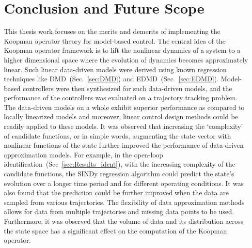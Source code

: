 \section{Conclusion and Future Scope}
\label{Chapter:Conc}
This thesis work focuses on the merits and demerits of implementing the Koopman operator theory for model-based control. The central idea of the Koopman operator framework is to lift the nonlinear dynamics of a system to a higher dimensional space where the evolution of dynamics becomes approximately linear. Such linear data-driven models were derived using known regression techniques like DMD~(Sec.~\ref{sec:DMD}) and EDMD~(Sec.~\ref{sec:EDMD}). Model-based controllers were then synthesized for such data-driven models, and the performance of the controllers was evaluated on a trajectory tracking problem. The data-driven models on a whole exhibit superior performance as compared to locally linearized models and moreover, linear control design methods could be readily applied to these models. It was observed that increasing the `complexity' of candidate functions, or in simple words, augmenting the state vector with nonlinear functions of the state further improved the performance of data-driven approximation models. For example, in the open-loop identification~(Sec~\ref{sec:Results_ident}), with the increasing complexity of the candidate functions, the SINDy regression algorithm could predict the state's evolution over a longer time period and for different operating conditions. It was also found that the prediction could be further improved when the data are sampled from various trajectories. The flexibility of data approximation methods allows for data from multiple trajectories and missing data points to be used. Furthermore, it was observed that the volume of data and its distribution across the state space has a significant effect on the computation of the Koopman operator.  \par
